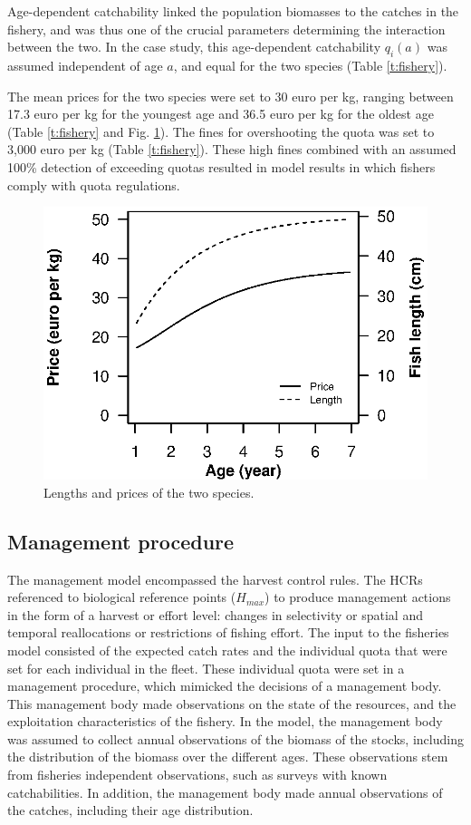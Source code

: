 \documentclass[12pt,oneline,a4paper,numbib]{ouparticle}
\numberwithin{equation}{subsection} %
\begin{document}
Age-dependent catchability linked the population biomasses to the catches in the fishery, and was thus one of the crucial parameters determining the interaction between the two. In the case study, this age-dependent catchability $q_i (a)$ was assumed independent of age $a$, and equal for the two species (Table \ref{t:fishery}).

The mean prices for the two species were set to 30 euro per kg, ranging between 17.3 euro per kg for the youngest age and 36.5 euro per kg for the oldest age (Table \ref{t:fishery} and Fig. \ref{f:prices}). The fines for overshooting the quota was set to 3,000 euro per kg (Table \ref{t:fishery}). These high fines combined with an assumed 100\% detection of exceeding quotas resulted in model results in which fishers comply with quota regulations.

\begin{figure}[!ht]
\centering
\includegraphics[width=.5\textwidth]{Figures/Prices.eps} 
\caption{Lengths and prices of the two species.}
\label{f:prices}
\end{figure}

\subsection{Management procedure}

The management model encompassed the harvest control rules. The HCRs referenced to biological reference points ($H_{max}$) to produce management actions in the form of a harvest or effort level: changes in selectivity or spatial and temporal reallocations or restrictions of fishing effort. The input to the fisheries model consisted of the expected catch rates and the individual quota that were set for each individual in the fleet. These individual quota were set in a management procedure, which mimicked the decisions of a management body. This management body made observations on the state of the resources, and the exploitation characteristics of the fishery. In the model, the management body was assumed to collect annual observations of the biomass of the stocks, including the distribution of the biomass over the different ages. These observations stem from fisheries independent observations, such as surveys with known catchabilities. In addition, the management body made annual observations of the catches, including their age distribution. 
\end{document}
